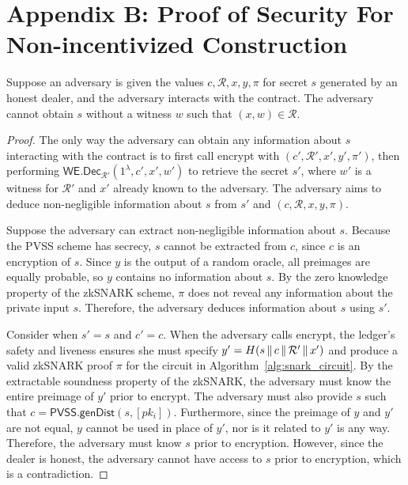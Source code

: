 \section{Appendix B: Proof of Security For Non-incentivized Construction}
\begin{lemma}\label{lemma:non_malleability_appendix}
    Suppose an adversary is given the values $c, \mathcal{R}, x, y, \pi$ for secret $s$ generated by an honest dealer, and the adversary interacts with the contract.
    The adversary cannot obtain $s$ without a witness $w$ such that $(x, w) \in \mathcal{R}$.
\end{lemma}
\begin{proof}
    The only way the adversary can obtain any information about $s$ interacting with the contract is to first call \textsf{encrypt} with $(c', \mathcal{R}', x', y', \pi')$,
    then performing $\textsf{WE.Dec}_{\mathcal{R}'}(1^{\lambda}, c', x', w')$ to retrieve the secret $s'$, where $w'$ is a witness for $\mathcal{R}'$ and $x'$ already known to the adversary.
    The adversary aims to deduce non-negligible information about $s$ from $s'$ and $(c, \mathcal{R}, x, y, \pi)$.

    Suppose the adversary can extract non-negligible information about $s$.
    Because the PVSS scheme has secrecy, $s$ cannot be extracted from $c$, since $c$ is an encryption of $s$.
    Since $y$ is the output of a random oracle, all preimages are equally probable, so $y$ contains no information about $s$.
    By the zero knowledge property of the zkSNARK scheme, $\pi$ does not reveal any information about the private input $s$.
    Therefore, the adversary deduces information about $s$ using $s'$.

    Consider when $s' = s$ and $c' = c$.
    When the adversary calls \textsf{encrypt}, the ledger's safety and liveness ensures she must specify $y' = H(s \,\|\, c \,\|\, \mathcal{R}' \,\|\, x')$ and produce a valid zkSNARK proof $\pi$ for the circuit in Algorithm~\ref{alg:snark_circuit}.
    By the extractable soundness property of the zkSNARK, the adversary must know the entire preimage of $y'$ prior to \textsf{encrypt}.
    The adversary must also provide $s$ such that $c = \textsf{PVSS.genDist}(s, [pk_i])$.
    Furthermore, since the preimage of $y$ and $y'$ are not equal, $y$ cannot be used in place of $y'$, nor is it related to $y'$ is any way.
    Therefore, the adversary must know $s$ prior to encryption.
    However, since the dealer is honest, the adversary cannot have access to $s$ prior to encryption, which is a contradiction.


\end{proof}
